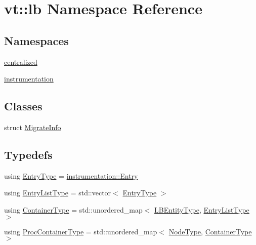 \hypertarget{namespacevt_1_1lb}{}\section{vt\+:\+:lb Namespace Reference}
\label{namespacevt_1_1lb}
\subsection*{Namespaces}
\begin{DoxyCompactItemize}
\item 
 \hyperlink{namespacevt_1_1lb_1_1centralized}{centralized}
\item 
 \hyperlink{namespacevt_1_1lb_1_1instrumentation}{instrumentation}
\end{DoxyCompactItemize}
\subsection*{Classes}
\begin{DoxyCompactItemize}
\item 
struct \hyperlink{structvt_1_1lb_1_1_migrate_info}{Migrate\+Info}
\end{DoxyCompactItemize}
\subsection*{Typedefs}
\begin{DoxyCompactItemize}
\item 
using \hyperlink{namespacevt_1_1lb_ab762a8296702082683628826ae4055cf}{Entry\+Type} = \hyperlink{structvt_1_1lb_1_1instrumentation_1_1_entry}{instrumentation\+::\+Entry}
\item 
using \hyperlink{namespacevt_1_1lb_a3abc8cab13c374a70c47f262182d6ce2}{Entry\+List\+Type} = std\+::vector$<$ \hyperlink{namespacevt_1_1lb_ab762a8296702082683628826ae4055cf}{Entry\+Type} $>$
\item 
using \hyperlink{namespacevt_1_1lb_aaed3aa01cc192561401ff2c611b4252f}{Container\+Type} = std\+::unordered\+\_\+map$<$ \hyperlink{namespacevt_a92ec26fb6644cd0ba7eb0ee70c96bee5}{L\+B\+Entity\+Type}, \hyperlink{namespacevt_1_1lb_a3abc8cab13c374a70c47f262182d6ce2}{Entry\+List\+Type} $>$
\item 
using \hyperlink{namespacevt_1_1lb_af7c6ee21a7b3966b7ab64c5b626d30f8}{Proc\+Container\+Type} = std\+::unordered\+\_\+map$<$ \hyperlink{namespacevt_a866da9d0efc19c0a1ce79e9e492f47e2}{Node\+Type}, \hyperlink{namespacevt_1_1lb_aaed3aa01cc192561401ff2c611b4252f}{Container\+Type} $>$
\end{DoxyCompactItemize}



